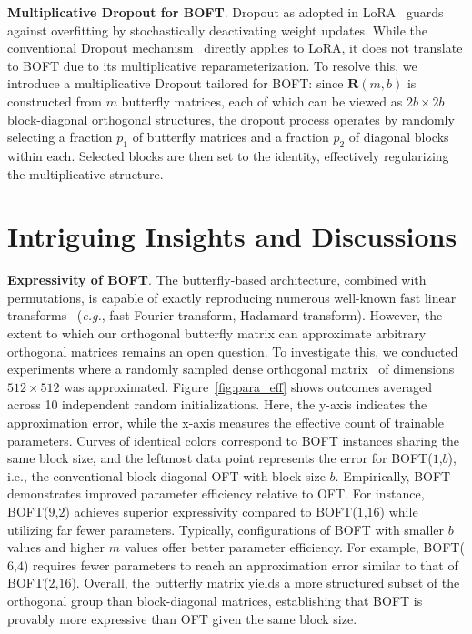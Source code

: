 \textbf{Multiplicative Dropout for BOFT}. Dropout as adopted in LoRA~\cite{hulora2022} guards against overfitting by stochastically deactivating weight updates. While the conventional Dropout mechanism~\cite{srivastava2014dropout} directly applies to LoRA, it does not translate to BOFT due to its multiplicative reparameterization. To resolve this, we introduce a multiplicative Dropout tailored for BOFT: since $\bm{R}(m,b)$ is constructed from $m$ butterfly matrices, each of which can be viewed as $2b\times 2b$ block-diagonal orthogonal structures, the dropout process operates by randomly selecting a fraction $p_1$ of butterfly matrices and a fraction $p_2$ of diagonal blocks within each. Selected blocks are then set to the identity, effectively regularizing the multiplicative structure. 

\section{Intriguing Insights and Discussions}

\textbf{Expressivity of BOFT}. The butterfly-based architecture, combined with permutations, is capable of exactly reproducing numerous well-known fast linear transforms~\cite{dao2019learning,dao2019kaleidoscope} (\emph{e.g.}, fast Fourier transform, Hadamard transform). However, the extent to which our orthogonal butterfly matrix can approximate arbitrary orthogonal matrices remains an open question. To investigate this, we conducted experiments where a randomly sampled dense orthogonal matrix~\cite{anderson1987generation} of dimensions $512\times 512$ was approximated. Figure~\ref{fig:para_eff} shows outcomes averaged across 10 independent random initializations. Here, the y-axis indicates the approximation error, while the x-axis measures the effective count of trainable parameters. Curves of identical colors correspond to BOFT instances sharing the same block size, and the leftmost data point represents the error for BOFT($1$,$b$), i.e., the conventional block-diagonal OFT with block size $b$. Empirically, BOFT demonstrates improved parameter efficiency relative to OFT. For instance, BOFT($9$,$2$) achieves superior expressivity compared to BOFT($1$,$16$) while utilizing far fewer parameters. Typically, configurations of BOFT with smaller $b$ values and higher $m$ values offer better parameter efficiency. For example, BOFT($6$,$4$) requires fewer parameters to reach an approximation error similar to that of BOFT($2$,$16$). Overall, the butterfly matrix yields a more structured subset of the orthogonal group than block-diagonal matrices, establishing that BOFT is provably more expressive than OFT given the same block size.

